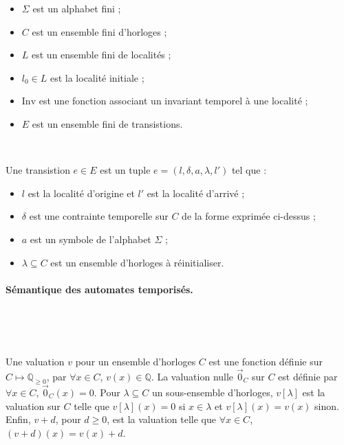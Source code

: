         \begin{itemize}
          \item $\Sigma$ est un alphabet fini ;
          \item $C$ est un ensemble fini d'horloges ;
          \item $L$ est un ensemble fini de localités ;
          \item $l_0 \in L$ est la localité initiale ;
          \item $\mathrm{Inv}$ est une fonction associant un invariant temporel
            à une localité ;
          \item $E$ est un ensemble fini de transistions.
        \end{itemize}
      
        ~

        \noindent
        Une transistion $e \in E$ est un tuple $e = (l, \delta, a, \lambda, l')$
        tel que :
      
        \begin{itemize}
          \item $l$ est la localité d'origine et $l'$ est la localité d'arrivé ;
          \item $\delta$ est une contrainte temporelle sur $C$ de la forme
            exprimée ci-dessus ;
          \item $a$ est un symbole de l'alphabet $\Sigma$ ;
          \item $\lambda \subseteq C$ est un ensemble d'horloges à
            réinitialiser.
        \end{itemize}

      \paragraph{Sémantique des automates temporisés.} ~
      
        ~
        
        Une valuation $v$ pour un ensemble d'horloges $C$ est une fonction définie
        sur $C \mapsto \mathbb{Q}_{\geq 0}$, par $\forall x \in C$, $v(x) \in
        \mathbb{Q}$. La valuation nulle $\vec{0}_C$ sur $C$ est définie par
        $\forall x \in C$, $\vec{0}_C(x) = 0$. Pour $\lambda \subseteq C$ un
        sous-ensemble d'horloges, $v[\lambda]$ est la valuation sur $C$ telle que
        $v[\lambda](x) = 0$ si $x \in \lambda$ et $v[\lambda](x) = v(x)$ sinon.
        Enfin, $v + d$, pour $d \geq 0$, est la valuation telle que $\forall x\in
        C$, $(v + d)(x) = v(x) + d$.
      
